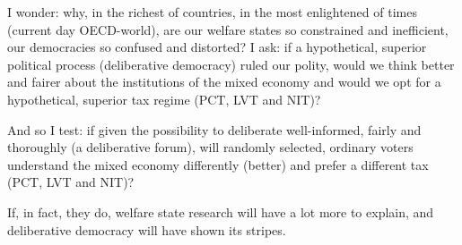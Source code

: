 I wonder: why, in the richest of countries, in the most enlightened of times (current day \gls{OECD}-world), are our welfare states so constrained and inefficient, our democracies so confused and distorted?
I ask: if a hypothetical, superior political process (deliberative democracy) ruled our polity, would we think better and fairer about the institutions of the mixed economy and would we opt for a hypothetical, superior tax regime (\gls{PCT}, \gls{LVT} and \gls{NIT})?

And so I test: if given the possibility to deliberate well-informed, fairly and thoroughly (a deliberative forum), will randomly selected, ordinary voters understand the mixed economy differently (better) and prefer a different tax (\gls{PCT}, \gls{LVT} and \gls{NIT})? %


If, in fact, they do, welfare state research will have a lot more to explain, and deliberative democracy will have shown its stripes.

%
